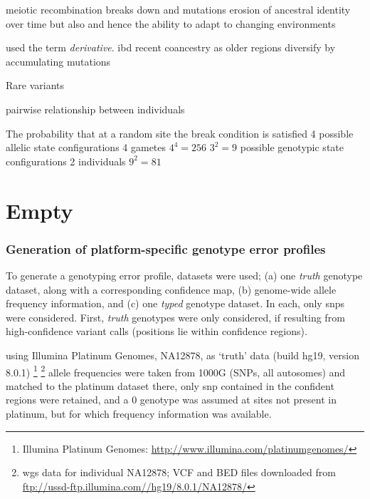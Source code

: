 



meiotic recombination breaks down
and mutations
erosion of ancestral identity over time
but also
and hence the ability to adapt to changing environments

\citet{cotterman1940calculus} used the term \emph{derivative}.
\Gls{ibd} \citet{malecot1948mathematics}
\citep{Thompson:2013cj}
recent coancestry
as older regions diversify by accumulating mutations

Rare variants

pairwise relationship between individuals



The probability that at a random site the break condition is satisfied
4 possible allelic state configurations
4 gametes
${4^4=256}$
${3^2=9}$ possible genotypic state configurations
2 individuals
${9^2=81}$




%
%
%
%
%
%
%
%
%
%
%
%


\section{Empty}

\subsubsection{Generation of platform-specific genotype error profiles}

To generate a genotyping error profile,  datasets were used;
(a) one \emph{truth} genotype dataset, along with a corresponding confidence map,
(b) genome-wide allele frequency information, and
(c) one \emph{typed} genotype dataset.
In each, only \glspl{snp} were considered.
First, \emph{truth} genotypes were only considered, if resulting from high-confidence variant calls (positions lie within confidence regions).


using Illumina Platinum Genomes, NA12878, as `truth' data (build hg19, version 8.0.1)
\footnote{Illumina Platinum Genomes: \url{http://www.illumina.com/platinumgenomes/}}
\footnote{\Gls{wgs} data for individual NA12878; VCF and BED files downloaded from \mbox{\url{ftp://ussd-ftp.illumina.com//hg19/8.0.1/NA12878/}}}
allele frequencies were taken from 1000G (SNPs, all autosomes) and matched to the platinum dataset
there, only \gls{snp} contained in the confident regions were retained,
and a 0 genotype was assumed at sites not present in platinum, but for which frequency information was available.

